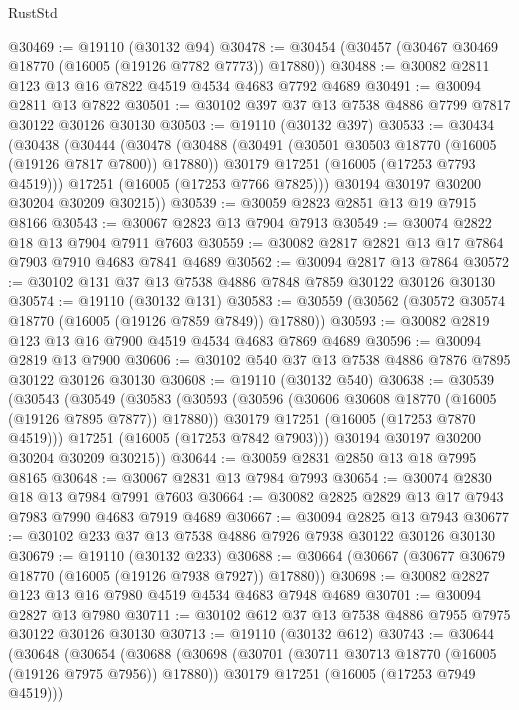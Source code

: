 \begin{lexlean}{RustStd}
\begin{coremodule}
@30469 := @19110 (@30132 @94)
@30478 := @30454 (@30457 (@30467 @30469 @18770 (@16005 (@19126 @7782 @7773)) @17880))
@30488 := @30082 @2811 @123 @13 @16 @7822 @4519 @4534 @4683 @7792 @4689
@30491 := @30094 @2811 @13 @7822
@30501 := @30102 @397 @37 @13 @7538 @4886 @7799 @7817 @30122 @30126 @30130
@30503 := @19110 (@30132 @397)
@30533 := @30434
    (@30438
      (@30444
        (@30478
          (@30488
            (@30491 (@30501 @30503 @18770 (@16005 (@19126 @7817 @7800)) @17880))
            @30179
            @17251
            (@16005 (@17253 @7793 @4519)))
          @17251
          (@16005 (@17253 @7766 @7825)))
        @30194
        @30197
        @30200
        @30204
        @30209
        @30215))
@30539 := @30059 @2823 @2851 @13 @19 @7915 @8166
@30543 := @30067 @2823 @13 @7904 @7913
@30549 := @30074 @2822 @18 @13 @7904 @7911 @7603
@30559 := @30082 @2817 @2821 @13 @17 @7864 @7903 @7910 @4683 @7841 @4689
@30562 := @30094 @2817 @13 @7864
@30572 := @30102 @131 @37 @13 @7538 @4886 @7848 @7859 @30122 @30126 @30130
@30574 := @19110 (@30132 @131)
@30583 := @30559 (@30562 (@30572 @30574 @18770 (@16005 (@19126 @7859 @7849)) @17880))
@30593 := @30082 @2819 @123 @13 @16 @7900 @4519 @4534 @4683 @7869 @4689
@30596 := @30094 @2819 @13 @7900
@30606 := @30102 @540 @37 @13 @7538 @4886 @7876 @7895 @30122 @30126 @30130
@30608 := @19110 (@30132 @540)
@30638 := @30539
    (@30543
      (@30549
        (@30583
          (@30593
            (@30596 (@30606 @30608 @18770 (@16005 (@19126 @7895 @7877)) @17880))
            @30179
            @17251
            (@16005 (@17253 @7870 @4519)))
          @17251
          (@16005 (@17253 @7842 @7903)))
        @30194
        @30197
        @30200
        @30204
        @30209
        @30215))
@30644 := @30059 @2831 @2850 @13 @18 @7995 @8165
@30648 := @30067 @2831 @13 @7984 @7993
@30654 := @30074 @2830 @18 @13 @7984 @7991 @7603
@30664 := @30082 @2825 @2829 @13 @17 @7943 @7983 @7990 @4683 @7919 @4689
@30667 := @30094 @2825 @13 @7943
@30677 := @30102 @233 @37 @13 @7538 @4886 @7926 @7938 @30122 @30126 @30130
@30679 := @19110 (@30132 @233)
@30688 := @30664 (@30667 (@30677 @30679 @18770 (@16005 (@19126 @7938 @7927)) @17880))
@30698 := @30082 @2827 @123 @13 @16 @7980 @4519 @4534 @4683 @7948 @4689
@30701 := @30094 @2827 @13 @7980
@30711 := @30102 @612 @37 @13 @7538 @4886 @7955 @7975 @30122 @30126 @30130
@30713 := @19110 (@30132 @612)
@30743 := @30644
    (@30648
      (@30654
        (@30688
          (@30698
            (@30701 (@30711 @30713 @18770 (@16005 (@19126 @7975 @7956)) @17880))
            @30179
            @17251
            (@16005 (@17253 @7949 @4519)))

\end{coremodule}
\end{lexlean}
